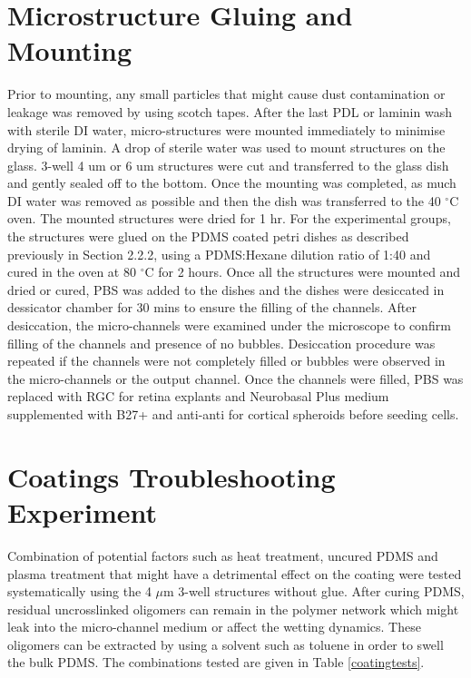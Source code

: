 \documentclass{book}
\begin{document}
\section{Microstructure Gluing and Mounting} 
Prior to mounting, any small particles that might cause dust contamination or leakage was removed by using scotch tapes. \cite{shin2012microfluidic} After the last PDL or laminin wash with sterile DI water, micro-structures were mounted immediately to minimise drying of laminin. A drop of sterile water was used to mount structures on the glass. 3-well 4 um or 6 um structures were cut and transferred to the glass dish and gently sealed off to the bottom. Once the mounting was completed, as much DI water was removed as possible and then the dish was transferred to the 40 $^{\circ}$C oven. The mounted structures were dried for 1 hr. For the experimental groups, the structures were glued on the PDMS coated petri dishes as described previously in Section 2.2.2, using a PDMS:Hexane dilution ratio of 1:40 and cured in the oven at 80 $^{\circ}$C for 2 hours. Once all the structures were mounted and dried or cured, PBS was added to the dishes and the dishes were desiccated in dessicator chamber for 30 mins to ensure the filling of the channels. After desiccation, the micro-channels were examined under the microscope to confirm filling of the channels and presence of no bubbles. Desiccation procedure was repeated if the channels were not completely filled or bubbles were observed in the micro-channels or the output channel. Once the channels were filled, PBS was replaced with RGC for retina explants and Neurobasal Plus medium supplemented with B27+ and anti-anti for cortical spheroids before seeding cells.

\section{Coatings Troubleshooting Experiment}
Combination of potential factors such as heat treatment, uncured PDMS and plasma treatment that might have a detrimental effect on the coating were tested systematically using the 4 $\mu$m 3-well structures without glue. After curing PDMS, residual uncrosslinked oligomers can remain in the polymer network which might leak into the micro-channel medium or affect the wetting dynamics. These oligomers can be extracted by using a solvent such as toluene in order to swell the bulk PDMS. \cite{hourlier2017role} \cite{martin2021nanoscale} The combinations tested are given in Table \ref{coatingtests}.
\end{document}
